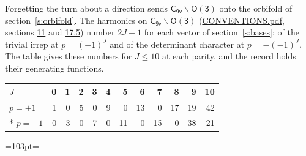 \documentclass[10pt,a4paper]{article}
\newcommand{\needspace}[1]{\par\penalty-100\begingroup\dimen0=#1\relax\dimen2=\pagegoal
  \advance\dimen2-\pagetotal\ifdim\dimen0>\dimen2\relax\ifdim\dimen2>0pt\vfil\break\fi\fi
  \endgroup}
\numberwithin{equation}{section}
\newcommand{\grp}[1]{\mathsf{#1}}
\begin{document}
Forgetting the turn about a direction sends $\grp{C_{9v}}\backslash\grp{O(3)}$ onto the orbifold of section~\ref{s:orbifold}.
The harmonics on $\grp{C_{9v}}\backslash\grp{O(3)}$ (\href{../../CONVENTIONS.pdf}{CONVENTIONS.pdf}, sections \href{../../CONVENTIONS.pdf\#conv.11}{11} and \href{../../CONVENTIONS.pdf\#conv.17.5}{17.5}) number $2J + 1$ for each vector of section~\ref{s:bases}: of the trivial irrep at $p = (-1)^J$ and of the determinant character at $p = -(-1)^J$. The table gives these numbers for $J \le 10$ at each parity, and the record holds their generating functions.
{\small\setlength{\tabcolsep}{4pt}\begin{longtable}{@{}lrrrrrrrrrrr@{}}\toprule
$J$ & 0 & 1 & 2 & 3 & 4 & 5 & 6 & 7 & 8 & 9 & 10\\\midrule\endhead
\bottomrule\endfoot\endlastfoot
$p = +1$ & 1 & 0 & 5 & 0 & 9 & 0 & 13 & 0 & 17 & 19 & 42\\*
$p = -1$ & 0 & 3 & 0 & 7 & 0 & 11 & 0 & 15 & 0 & 38 & 21\\
\bottomrule\end{longtable}}
\needspace{103pt}
\end{document}
